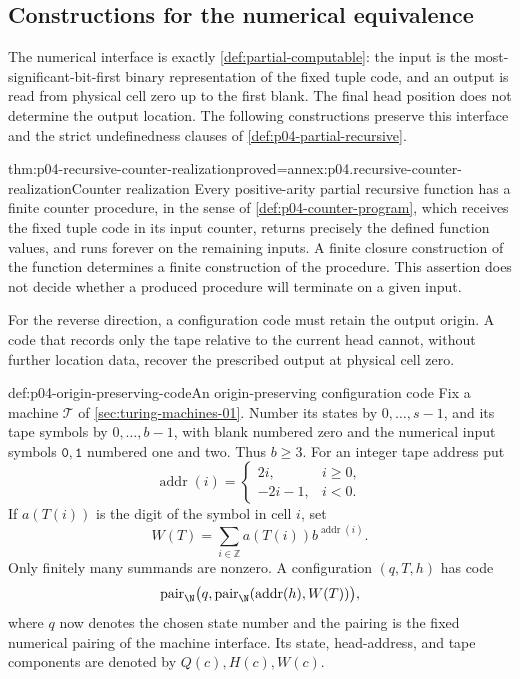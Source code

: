 \subsection{Constructions for the numerical equivalence}
\label{sec:p04-recursive-machine-constructions}

The numerical interface is exactly \cref{def:partial-computable}: the
input is the most-significant-bit-first binary representation of the fixed
tuple code, and an output is read from physical cell zero up to the first
blank. The final head position does not determine the output location.
The following constructions preserve this interface and the strict
undefinedness clauses of \cref{def:p04-partial-recursive}.

\begin{hblemma}{thm:p04-recursive-counter-realization}{proved=annex:p04.recursive-counter-realization}{Counter realization}
Every positive-arity partial recursive function has a finite counter
procedure, in the sense of \cref{def:p04-counter-program}, which receives
the fixed tuple code in its input counter, returns precisely the defined
function values, and runs forever on the remaining inputs. A finite
closure construction of the function determines a finite construction of
the procedure. This assertion does not decide whether a produced procedure
will terminate on a given input.
\end{hblemma}

For the reverse direction, a configuration code must retain the output
origin. A code that records only the tape relative to the current head
cannot, without further location data, recover the prescribed output at
physical cell zero.

\begin{hbdefinition}{def:p04-origin-preserving-code}{An origin-preserving configuration code}
Fix a machine \(\mathcal T\) of \cref{sec:turing-machines-01}. Number its
states by \(0,\ldots,s-1\), and its tape symbols by
\(0,\ldots,b-1\), with blank numbered zero and the numerical input
symbols \(\mathtt0,\mathtt1\) numbered one and two. Thus \(b\geq3\).
For an integer tape address put
\[
 \operatorname{addr}(i)=
 \begin{cases}2i,&i\geq0,\\-2i-1,&i<0.\end{cases}
\]
If \(a(T(i))\) is the digit of the symbol in cell \(i\), set
\[
 W(T)=\sum_{i\in\mathbb Z}a(T(i))b^{\operatorname{addr}(i)}.
\]
Only finitely many summands are nonzero. A configuration \((q,T,h)\)
has code
\[
 \operatorname{pair}_{\N}\bigl(q,
       \operatorname{pair}_{\N}(\operatorname{addr}(h),W(T))\bigr),
\]
where \(q\) now denotes the chosen state number and the pairing is the
fixed numerical pairing of the machine interface. Its state, head-address,
and tape components are denoted by \(Q(c),H(c),W(c)\).
\end{hbdefinition}

